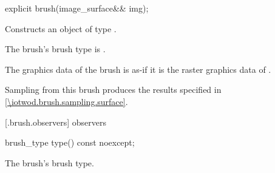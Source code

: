 %
\begin{itemdecl}
explicit brush(image_surface&& img);
\end{itemdecl}
\begin{itemdescr}
\pnum
\effects
Constructs an object of type .

\pnum
The brush's brush type is .

\pnum
The graphics data of the brush is as-if it is the raster graphics data of .

\pnum
\remarks
Sampling from this brush produces the results specified in \ref{\iotwod.brush.sampling.surface}.
\end{itemdescr}

 [\iotwod.brush.observers]{ observers}

%
\begin{itemdecl}
brush_type type() const noexcept;
\end{itemdecl}
\begin{itemdescr}
\pnum
\returns
The brush's brush type.
\end{itemdescr}
